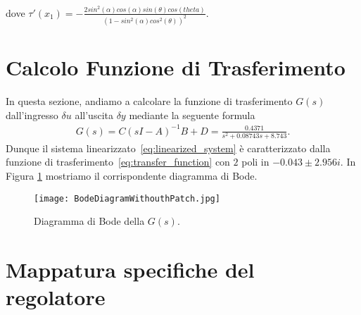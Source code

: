 \documentclass[a4paper, 11pt]{article}
\begin{document}
	dove $\tau'(x_1)= - \frac{2sin^2(\alpha)cos(\alpha)sin(\theta)cos(theta)} 
 {(1-sin^2(\alpha)cos^2(\theta))^2}$.
	\section{Calcolo Funzione di Trasferimento}
	
	In questa sezione, andiamo a calcolare la funzione di trasferimento $G(s)$ dall'ingresso $\delta u$ all'uscita $\delta y$ mediante la seguente formula 
	\begin{align}\label{eq:transfer_function}
		G(s) = C(sI - A)^{-1}B+D = \frac{0.4371}{s^2 + 0.08743 s + 8.743}.
	\end{align}
	Dunque il sistema linearizzato~\eqref{eq:linearized_system} è caratterizzato dalla funzione di trasferimento~\eqref{eq:transfer_function} con $2$ poli in $-0.043 \pm 2.956i$. In Figura \ref{fig:G} mostriamo il corrispondente diagramma di Bode. 
	
	\begin{figure}[h]
		\centering
		\texttt{[image: BodeDiagramWithouthPatch.jpg]}
		\caption{Diagramma di Bode della $G(s)$.}
		\label{fig:G}
	\end{figure}
	
	\newcommand{\dB}{\text{dB}}
	
	\section{Mappatura specifiche del regolatore}
	\label{sec:specifications}
	
\end{document}

